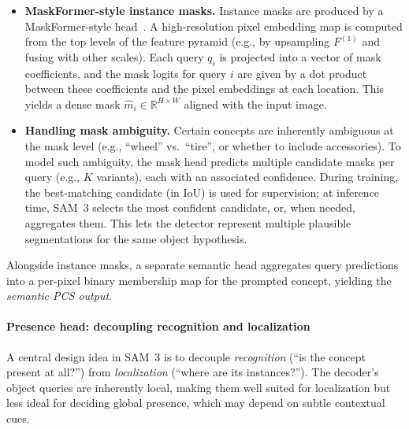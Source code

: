 \begin{enrichment}
\begin{enrichment}
\begin{itemize}
\begin{itemize}
				\newpage
				
				This ties confidence calibration tightly to geometric accuracy, which is crucial in open-vocabulary PCS where false positives are especially harmful.
			\end{itemize}
			The total detection loss combines bipartite-matching losses (box regression and classification) with these auxiliary terms.
			
			\item \textbf{MaskFormer-style instance masks.}
			Instance masks are produced by a MaskFormer-style head~\cite{cheng2021_maskformer}. A high-resolution pixel embedding map is computed from the top levels of the feature pyramid (e.g., by upsampling $F^{(1)}$ and fusing with other scales). Each query $q_i$ is projected into a vector of mask coefficients, and the mask logits for query $i$ are given by a dot product between these coefficients and the pixel embeddings at each location. This yields a dense mask $\hat{m}_i \in \mathbb{R}^{H\times W}$ aligned with the input image.
			
			\item \textbf{Handling mask ambiguity.}
			Certain concepts are inherently ambiguous at the mask level (e.g., ``wheel'' vs.\ ``tire'', or whether to include accessories). To model such ambiguity, the mask head predicts multiple candidate masks per query (e.g., $K$ variants), each with an associated confidence. During training, the best-matching candidate (in IoU) is used for supervision; at inference time, SAM~3 selects the most confident candidate, or, when needed, aggregates them. This lets the detector represent multiple plausible segmentations for the same object hypothesis.
		\end{itemize}
		
		Alongside instance masks, a separate semantic head aggregates query predictions into a per-pixel binary membership map for the prompted concept, yielding the \emph{semantic PCS output}.
		
		\paragraph{Presence head: decoupling recognition and localization}
		
		A central design idea in SAM~3 is to decouple \emph{recognition} (``is the concept present at all?'') from \emph{localization} (``where are its instances?''). The decoder’s object queries are inherently local, making them well suited for localization but less ideal for deciding global presence, which may depend on subtle contextual cues.
		

\end{enrichment}
\end{enrichment}
